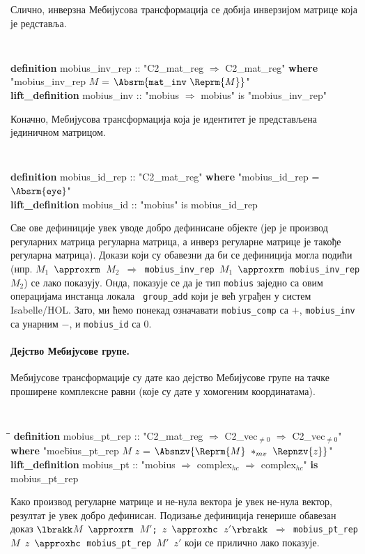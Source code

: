 \noindent Слично, инверзна Мебијусова трансформација се добија
инверзијом матрице која је редставља.

{\tt
\begin{tabbing}
{\bf def}\={\bf inition} mobius\_inv\_rep :: "C2\_mat\_reg $\Rightarrow$ C2\_mat\_reg" {\bf where} \\
         \>"mobius\_inv\_rep $M$ = $\Absrm{\mathtt{mat\_inv}\ \Reprm{M}}$"\\
{\bf lift\_definition} mobius\_inv :: "mobius $\Rightarrow$ mobius" is "mobius\_inv\_rep"
\end{tabbing}
}
\noindent Коначно, Мебијусова трансформација која је идентитет је
представљена јединичном матрицом.  {\tt
\begin{tabbing}
{\bf definition} mobius\_id\_rep :: "C2\_mat\_reg" {\bf where} "mobius\_id\_rep = $\Absrm{\mathtt{eye}}$"\\
{\bf lift\_definition} mobius\_id :: "mobius" is mobius\_id\_rep
\end{tabbing}
}

Све ове дефиниције увек уводе добро дефинисане објекте (јер је
производ регуларних матрица регуларна матрица, а инверз регуларне
матрице је такође регуларна матрица). Докази који су обавезни да би се
дефиниција могла подићи (нпр. {\tt $M_1$ $\approxrm$ $M_2$
  $\Longrightarrow$ mobius\_inv\_rep $M_1$ $\approxrm$
  mobius\_inv\_rep $M_2$}) се лако показују. Онда, показује се да је
тип {\tt mobius} заједно са овим операцијама инстанца локала {\tt
  group\_add} који је већ уграђен у систем Isabelle/HOL. Зато, ми ћемо
понекад означавати {\tt mobius\_comp} са $+$, {\tt mobius\_inv} са
унарним $-$, и {\tt mobius\_id} са $0$.

\paragraph{Дејство Мебијусове групе.}
Мебијусове трансформације су дате као дејство Мебијусове групе на
тачке проширене комплексне равни (које су дате у хомогеним
координатама).

{\tt
\begin{tabbing}
\hspace{5mm}\=\hspace{5mm}\=\hspace{5mm}\=\hspace{5mm}\=\hspace{5mm}\=\kill
{\bf definition} mobius\_pt\_rep :: "C2\_mat\_reg $\Rightarrow$ C2\_vec$_{\neq 0}$ $\Rightarrow$ C2\_vec$_{\neq 0}$"  \\
\> {\bf where} "moe\=bius\_pt\_rep $M$ $z$ = $\Absnzv{\Reprm{M}\ *_{mv}\ \Repnzv{z}}$"\\
{\bf lift\_definition} mobius\_pt :: "mobius $\Rightarrow$ complex$_{hc}$ $\Rightarrow$ complex$_{hc}$" {\bf is}\\
\> mobius\_pt\_rep
\end{tabbing}
}
\noindent Како производ регуларне матрице и не-нула вектора је увек
не-нула вектор, резултат је увек добро дефинисан. Подизање дефиниција
генерише обавезан доказ {\tt $\lbrakk$$M$ $\approxrm$ $M'$; $z$
  $\approxhc$ $z'$$\rbrakk$ $\Longrightarrow$ mobius\_pt\_rep $M$ $z$
  $\approxhc$ mobius\_pt\_rep $M'$ $z'$} који се прилично лако
показује.

